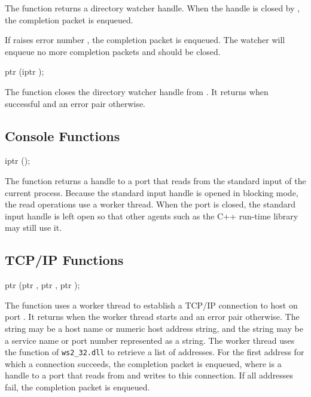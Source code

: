 The  function returns a directory watcher
handle. When the handle is closed by
, the completion packet
 is enqueued.

If  raises error number , the
completion packet  is enqueued.
The watcher will enqueue no more completion packets and should be
closed.

\begin{function}
  ptr (iptr );
\end{function}\antipar

The  function closes the directory
watcher handle  from . It
returns  when successful and an error pair otherwise.

\subsection {Console Functions}

\begin{function}
  iptr ();
\end{function}\antipar

The  function returns a handle to a port that
reads from the standard input of the current process. Because the
standard input handle is opened in blocking mode, the read operations
use a worker thread. When the port is closed, the standard input
handle is left open so that other agents such as the C++ run-time
library may still use it.

\subsection {TCP/IP Functions}

\begin{function}
  ptr (ptr , ptr , ptr );
\end{function}\antipar

The  function uses a worker thread to
establish a TCP/IP connection to host  on port
. It returns  when the worker thread starts
and an error pair otherwise. The  string may be a host
name or numeric host address string, and the  string may
be a service name or port number represented as a string. The worker
thread uses the  function of \texttt{ws2\_32.dll}
to retrieve a list of addresses. For the first address for which a
connection succeeds, the completion packet  is enqueued, where  is a handle to a port
that reads from and writes to this connection. If all addresses fail,
the completion packet  is
enqueued.

